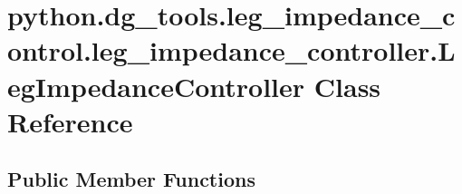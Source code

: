 \hypertarget{classpython_1_1dg__tools_1_1leg__impedance__control_1_1leg__impedance__controller_1_1LegImpedanceController}{}\section{python.\+dg\+\_\+tools.\+leg\+\_\+impedance\+\_\+control.\+leg\+\_\+impedance\+\_\+controller.\+Leg\+Impedance\+Controller Class Reference}
\label{classpython_1_1dg__tools_1_1leg__impedance__control_1_1leg__impedance__controller_1_1LegImpedanceController}
\subsection*{Public Member Functions}
